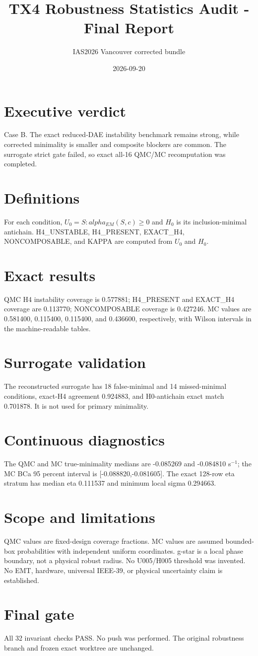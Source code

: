 \documentclass[10pt]{article}
\title{TX4 Robustness Statistics Audit - Final Report}
\author{IAS2026 Vancouver corrected bundle}
\date{2026-09-20}
\begin{document}
\maketitle
\section{Executive verdict}
Case B. The exact reduced-DAE instability benchmark remains strong, while corrected minimality is smaller and composite blockers are common. The surrogate strict gate failed, so exact all-16 QMC/MC recomputation was completed.
\section{Definitions}
For each condition, $U_0={S: alpha_{EM}(S,c)\geq 0}$ and $H_0$ is its inclusion-minimal antichain. H4\_UNSTABLE, H4\_PRESENT, EXACT\_H4, NONCOMPOSABLE, and KAPPA are computed from $U_0$ and $H_0$.
\section{Exact results}
QMC H4 instability coverage is 0.577881; H4_PRESENT and EXACT_H4 coverage are 0.113770; NONCOMPOSABLE coverage is 0.427246. MC values are 0.581400, 0.115400, 0.115400, and 0.436600, respectively, with Wilson intervals in the machine-readable tables.
\section{Surrogate validation}
The reconstructed surrogate has 18 false-minimal and 14 missed-minimal conditions, exact-H4 agreement 0.924883, and H0-antichain exact match 0.701878. It is not used for primary minimality.
\section{Continuous diagnostics}
The QMC and MC true-minimality medians are -0.085269 and -0.084810 s$^{-1}$; the MC BCa 95 percent interval is [-0.088820,-0.081605]. The exact 128-row eta stratum has median eta 0.111537 and minimum local sigma 0.294663.
\section{Scope and limitations}
QMC values are fixed-design coverage fractions. MC values are assumed bounded-box probabilities with independent uniform coordinates. g-star is a local phase boundary, not a physical robust radius. No U005/H005 threshold was invented. No EMT, hardware, universal IEEE-39, or physical uncertainty claim is established.
\section{Final gate}
All 32 invariant checks PASS. No push was performed. The original robustness branch and frozen exact worktree are unchanged.
\end{document}
